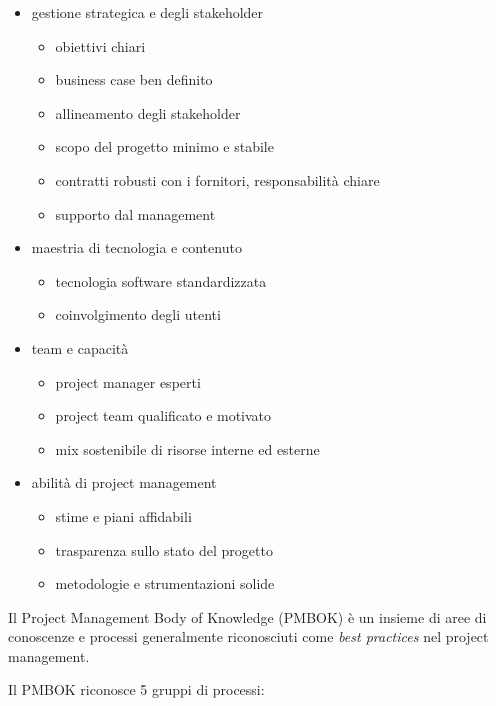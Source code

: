 \documentclass[answers, a4paper, 11pt]{exam}
\begin{document}
\begin{itemize}
    \item gestione strategica e degli stakeholder
    \begin{itemize}
        \item obiettivi chiari
        \item business case ben definito
        \item allineamento degli stakeholder
        \item scopo del progetto minimo e stabile
        \item contratti robusti con i fornitori, responsabilità chiare
        \item supporto dal management
    \end{itemize}
    \item maestria di tecnologia e contenuto
    \begin{itemize}
        \item tecnologia software standardizzata
        \item coinvolgimento degli utenti
    \end{itemize}
    \item team e capacità
    \begin{itemize}
        \item project manager esperti
        \item project team qualificato e motivato
        \item mix sostenibile di risorse interne ed esterne
    \end{itemize}
    \item abilità di project management
    \begin{itemize}
        \item stime e piani affidabili
        \item trasparenza sullo stato del progetto
        \item metodologie e strumentazioni solide
    \end{itemize}
\end{itemize}

Il Project Management Body of Knowledge (PMBOK) è un insieme di aree di conoscenze e processi generalmente riconosciuti come \emph{best practices} nel project management. 

Il PMBOK riconosce 5 gruppi di processi:
\end{document}
